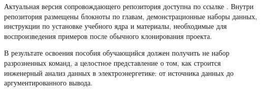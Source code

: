 Актуальная версия сопровождающего репозитория доступна по ссылке . Внутри репозитория размещены блокноты по главам, демонстрационные наборы данных, инструкции по установке учебного ядра и материалы, необходимые для воспроизведения примеров после обычного клонирования проекта.

В результате освоения пособия обучающийся должен получить не набор разрозненных команд, а целостное представление о том, как строится инженерный анализ данных в электроэнергетике: от источника данных до аргументированного вывода.

